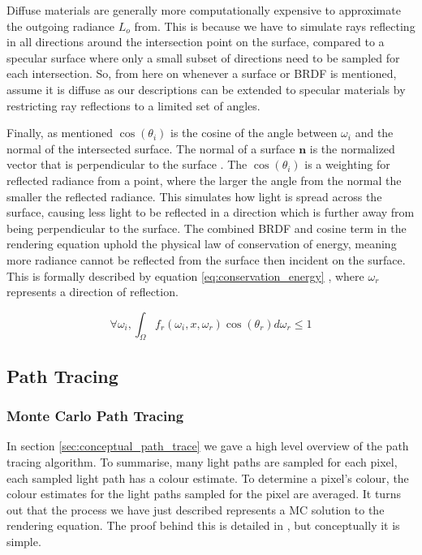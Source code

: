 \documentclass[../dissertation.tex]{subfiles}
\begin{document}
Diffuse materials are generally more computationally expensive to approximate the outgoing radiance $L_o$ from. This is because we have to simulate rays reflecting in all directions around the intersection point on the surface, compared to a specular surface where only a small subset of directions need to be sampled for each intersection. So, from here on whenever a surface or BRDF is mentioned, assume it is diffuse as our descriptions can be extended to specular materials by restricting ray reflections to a limited set of angles.

Finally, as mentioned $\cos(\theta_i)$ is the cosine of the angle between $\omega_i$ and the normal of the intersected surface. The normal of a surface $\mathbf{n}$ is the normalized vector that is perpendicular to the surface \cite{normals}. The $\cos(\theta_i)$ is a weighting for reflected radiance from a point, where the larger the angle from the normal the smaller the reflected radiance. This simulates how light is spread across the surface, causing less light to be reflected in a direction which is further away from being perpendicular to the surface. The combined BRDF and cosine term in the rendering equation uphold the physical law of conservation of energy, meaning more radiance cannot be reflected from the surface then incident on the surface. This is formally described by equation \ref{eq:conservation_energy} \cite{glassner2014principles}, where $\omega_r$ represents a direction of reflection.

\begin{equation}
\forall \omega_i, \int_\Omega f_r(\omega_i, x, \omega_r) \cos(\theta_r) d\omega_r \leq 1
\label{eq:conservation_energy}
\end{equation}

\subsection{Path Tracing}

\subsubsection{Monte Carlo Path Tracing}
\label{sec:monte_carlo_path_tracing}

In section \ref{sec:conceptual_path_trace} we gave a high level overview of the path tracing algorithm. To summarise, many light paths are sampled for each pixel, each sampled light path has a colour estimate. To determine a pixel's colour, the colour estimates for the light paths sampled for the pixel are averaged. It turns out that the process we have just described represents a MC solution to the rendering equation. The proof behind this is detailed in \cite{stanford_graphics}, but conceptually it is simple. 
\end{document}
